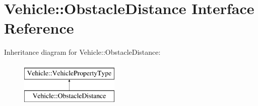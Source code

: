\hypertarget{interfaceVehicle_1_1ObstacleDistance}{\section{Vehicle\-:\-:Obstacle\-Distance Interface Reference}
\label{interfaceVehicle_1_1ObstacleDistance}
}
Inheritance diagram for Vehicle\-:\-:Obstacle\-Distance\-:\begin{figure}[H]
\begin{center}
\leavevmode
\includegraphics[height=2.000000cm]{interfaceVehicle_1_1ObstacleDistance}
\end{center}
\end{figure}
